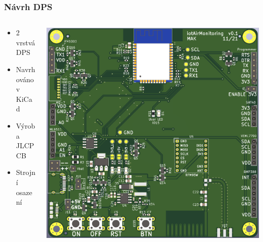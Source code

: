 \documentclass[%
  12pt,       				%
	t,                  %
	aspectratio=1610,   %
	unicode,						%
]{beamer}				    	%
\begin{document}
\begin{frame}
	\frametitle{Návrh DPS}
	\begin{columns}[T]
		\begin{column}{0.4\columnwidth}
			\begin{itemize}
				\item 2 vrstvá DPS
				\item Navrhováno v KiCad
				\item Výroba JLCPCB
				\item Strojní osazení
			\end{itemize}
		\end{column}

		\begin{column}{0.6\columnwidth}
			\centering
			\includegraphics[width=0.85\columnwidth]{obrazky/PCB_top.png}
		\end{column}
	\end{columns}
\end{frame}

\end{document}
